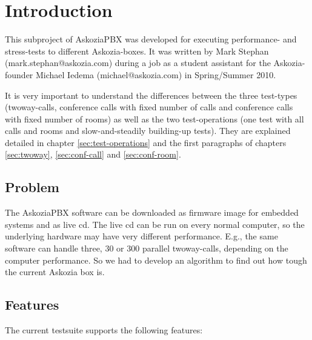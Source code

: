 \section{Introduction}
\label{sec:introduction}

This subproject of AskoziaPBX was developed for executing performance- and stress-tests to different Askozia-boxes.
It was written by Mark Stephan \newline (mark.stephan@askozia.com) during a job as a student
assistant for the Askozia-founder Michael Iedema (michael@askozia.com) in Spring/Summer 2010. 

It is very important to understand the differences between the three test-types (twoway-calls, conference calls with fixed number of
calls and conference calls with fixed number of rooms) as well as the two test-operations (one test with all calls and rooms and
slow-and-steadily building-up tests). They are explained detailed in chapter \ref{sec:test-operations} and the first paragraphs of chapters
\ref{sec:twoway}, \ref{sec:conf-call} and \ref{sec:conf-room}.

\subsection{Problem}%
The AskoziaPBX software can be downloaded as firmware image for embedded systems and as live cd. The live cd can be run on every normal computer, so the underlying hardware may have very different performance. E.g., the same software can handle three, 30 or 300 parallel twoway-calls, depending on the computer performance. So we had to develop an algorithm to find out how tough the current Askozia box is.
 
\subsection{Features}%
The current testsuite supports the following features:

